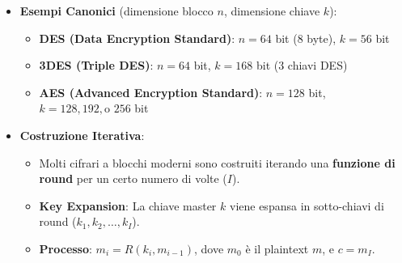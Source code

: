 \begin{itemize}
    \item \textbf{Esempi Canonici} (dimensione blocco $n$, dimensione chiave $k$):
    \begin{itemize}
        \item \textbf{DES (Data Encryption Standard)}: $n = 64$ bit (8 byte), $k = 56$ bit
        \item \textbf{3DES (Triple DES)}: $n = 64$ bit, $k = 168$ bit (3 chiavi DES)
        \item \textbf{AES (Advanced Encryption Standard)}: $n = 128$ bit, $k = 128, 192, \text{o } 256$ bit
    \end{itemize}
    \item \textbf{Costruzione Iterativa}:
    \begin{itemize}
        \item Molti cifrari a blocchi moderni sono costruiti iterando una \textbf{funzione di round} per un certo numero di volte ($I$).
        \item \textbf{Key Expansion}: La chiave master $k$ viene espansa in sotto-chiavi di round ($k_1, k_2, \dots, k_I$).
        \item \textbf{Processo}: $m_i = R(k_i, m_{i-1})$, dove $m_0$ è il plaintext $m$, e $c = m_I$.
    \end{itemize}
\end{itemize}

